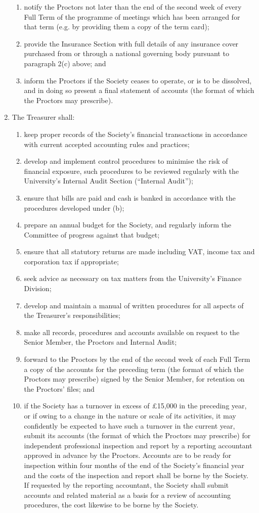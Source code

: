 \documentclass[11pt]{article}
\begin{document}
\begin{enumerate}
\begin{enumerate}
\item notify the Proctors not later than the end of the second week of every Full Term of the programme of meetings which has been arranged for that term (e.g. by providing them a copy of the term card); 
\item provide the Insurance Section with full details of any insurance cover purchased from or through a national governing body pursuant to paragraph 2(c) above; and
\item inform the Proctors if the Society ceases to operate, or is to be dissolved, and in doing so present a final statement of accounts (the format of which the Proctors may prescribe).
\end{enumerate}
\item The Treasurer shall:
\begin{enumerate}
\item keep proper records of the Society's financial transactions in accordance with current accepted accounting rules and practices;
\item develop and implement control procedures to minimise the risk of financial exposure, such procedures to be reviewed regularly with the University's Internal Audit Section (``Internal Audit'');
\item ensure that bills are paid and cash is banked in accordance with the procedures developed under (b);
\item prepare an annual budget for the Society, and regularly inform the Committee of progress against that budget;
\item ensure that all statutory returns are made including VAT, income tax and corporation tax if appropriate;
\item seek advice as necessary on tax matters from the University's Finance Division;
\item develop and maintain a manual of written procedures for all aspects of the Treasurer's responsibilities;
\item make all records, procedures and accounts available on request to the Senior Member, the Proctors and Internal Audit;
\item forward to the Proctors by the end of the second week of each Full Term a copy of the accounts for the preceding term (the format of which the Proctors may prescribe) signed by the Senior Member, for retention on the Proctors' files; and
\item if the Society has a turnover in excess of \pounds 15,000 in the preceding year, or if owing to a change in the nature or scale of its activities, it may confidently be expected to have such a turnover in the current year, submit its accounts (the format of which the Proctors may prescribe) for independent professional inspection and report by a reporting accountant approved in advance by the Proctors. Accounts are to be ready for inspection within four months of the end of the Society's financial year and the costs of the inspection and report shall be borne by the Society. If requested by the reporting accountant, the Society shall submit accounts and related material as a basis for a review of accounting procedures, the cost likewise to be borne by the Society.

\end{enumerate}
\end{enumerate}
\end{document}
